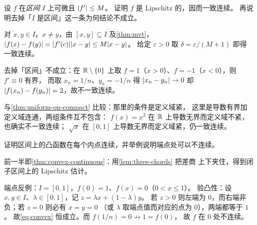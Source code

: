 \begin{exercise}[结构]
  \label{exr:bounded-derivative}
  设 \(f\) 在\emph{区间} \(I\) 上可微且 \(\lvert f'\rvert \le M\)。
  证明 \(f\) 是 Lipschitz 的，因而一致连续。
  再说明去掉「\(I\) 是区间」这一条为何结论不成立。
  \begin{solution}
    对 \(x,y \in I\)，\(x \neq y\)，由 \([x,y] \subseteq I\) 及\cref{thm:mvt}，
    \(\lvert f(x)-f(y)\rvert = \lvert f'(c)\rvert\lvert x-y\rvert \le M\lvert x-y\rvert\)。
    给定 \(\varepsilon>0\) 取 \(\delta = \varepsilon/(M+1)\) 即得一致连续。

    去掉「区间」不成立：在 \(\mathbb{R} \setminus \left\{0\right\}\) 上取
    \(f=1\)（\(x>0\)）、\(f=-1\)（\(x<0\)），则 \(f' \equiv 0\) 有界，
    而取 \(x_{n}=1/n\)、\(y_{n}=-1/n\) 得 \(\lvert x_{n}-y_{n}\rvert \to 0\)
    却 \(\lvert f(x_{n})-f(y_{n})\rvert=2\)，故不一致连续。

    与\cref{thm:uniform-on-compact} 比较：那里的条件是定义域紧，
    这里是导数有界加定义域连通，两组条件互不包含：
    \(f(x)=x^{2}\) 在 \(\mathbb{R}\) 上导数无界而定义域不紧，也确实不一致连续；
    \(\sqrt{x}\) 在 \([0,1]\) 上导数无界而定义域紧，仍一致连续。
  \end{solution}
\end{exercise}

\begin{exercise}[结构]
  \label{exr:convex-continuous}
  证明区间上的凸函数在每个内点连续，并举例说明端点处可以不连续。
  \begin{solution}
    前一半即\cref{thm:convex-continuous}：用\cref{lem:three-chords} 把差商
    上下夹住，得到闭子区间上的 Lipschitz 估计。

    端点反例：\(I=[0,1]\)，\(f(0)=1\)、\(f(x)=0\)（\(0<x\le1\)）。
    验凸性：设 \(x,y \in I\)、\(\lambda \in [0,1]\)，记 \(z=\lambda x+(1-\lambda)y\)。
    若 \(z>0\) 则左端为 \(0\)，而右端非负；若 \(z=0\) 则必有 \(x=y=0\)
    （或 \(\lambda\) 取端点值而对应的点为 \(0\)），两端都等于 \(1\)。
    故\cref{eq:convex} 恒成立。而 \(f(1/n) = 0 \not\to 1 = f(0)\)，
    故 \(f\) 在 \(0\) 处不连续。
  \end{solution}
\end{exercise}

